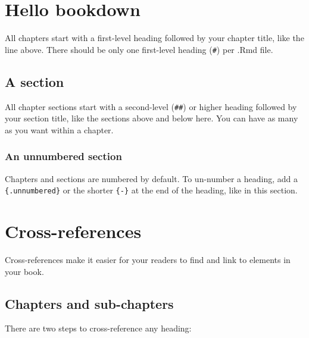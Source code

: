 \documentclass[
]{book}
\theoremstyle{definition}
\theoremstyle{definition}
\theoremstyle{definition}
\theoremstyle{definition}
\theoremstyle{remark}
\begin{document}
\hypertarget{hello-bookdown-7}{%
\chapter{Hello bookdown}\label{hello-bookdown-7}}

All chapters start with a first-level heading followed by your chapter title, like the line above. There should be only one first-level heading (\texttt{\#}) per .Rmd file.

\hypertarget{a-section-7}{%
\section{A section}\label{a-section-7}}

All chapter sections start with a second-level (\texttt{\#\#}) or higher heading followed by your section title, like the sections above and below here. You can have as many as you want within a chapter.

\hypertarget{an-unnumbered-section-7}{%
\subsection*{An unnumbered section}\label{an-unnumbered-section-7}}

Chapters and sections are numbered by default. To un-number a heading, add a \texttt{\{.unnumbered\}} or the shorter \texttt{\{-\}} at the end of the heading, like in this section.

\hypertarget{cross}{%
\chapter{Cross-references}\label{cross}}

Cross-references make it easier for your readers to find and link to elements in your book.

\hypertarget{chapters-and-sub-chapters}{%
\section{Chapters and sub-chapters}\label{chapters-and-sub-chapters}}

There are two steps to cross-reference any heading:
\end{document}
